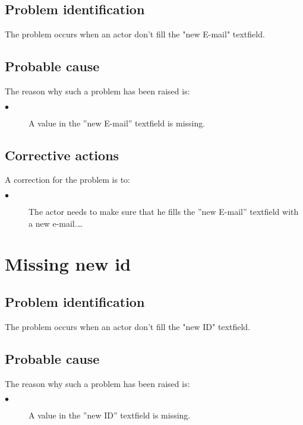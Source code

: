 \subsection{Problem identification}
The problem occurs when an actor don't fill the "new E-mail" textfield.

\subsection{Probable cause}

The reason why such a problem has been raised is:\\
\begin{description}
\item[$\bullet$] A value in the ''new E-mail'' textfield is missing.
\end{description}


\subsection{Corrective actions}

A correction for the problem is to:\\
\begin{description}
\item[$\bullet$] The actor needs to make sure that he fills the
''new E-mail'' textfield with a new e-mail.\ldots

\end{description}




\section{Missing new id} 

\subsection{Problem identification}
The problem occurs when an actor don't fill the "new ID" textfield.

\subsection{Probable cause}

The reason why such a problem has been raised is:\\
\begin{description}
\item[$\bullet$] A value in the ''new ID'' textfield is missing.
\end{description}


